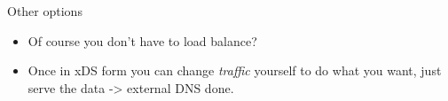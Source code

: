 \documentclass[aspectratio=169]{beamer}
\begin{document}
    \begin{frame}{Other options}
        \begin{itemize}
            \item Of course you don't have to load balance?
            \item Once in xDS form you can change \emph{traffic} yourself to do what you want, just serve
                    the data -> external DNS done.
        \end{itemize}
    \end{frame}
\end{document}
